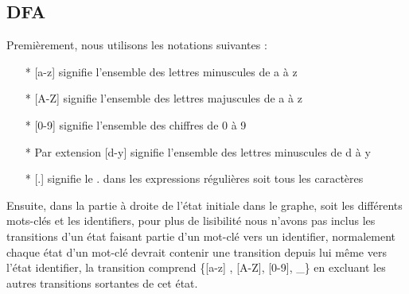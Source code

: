 \documentclass[a4paper,10pt]{article}
\begin{document}
\subsection{DFA}

Premièrement, nous utilisons les notations suivantes :
\begin{itemize}
\item [*][a-z] signifie l'ensemble des lettres minuscules de a à z
\item [*][A-Z] signifie l'ensemble des lettres majuscules de a à z
\item [*][0-9] signifie l'ensemble des chiffres de 0 à 9
\item [*]Par extension [d-y] signifie l'ensemble des lettres minuscules de d à y
\item [*][.] signifie le . dans les expressions régulières soit tous les caractères
\end{itemize}

Ensuite, dans la partie à droite de l'état initiale dans le graphe, soit les différents mots-clés et les identifiers, pour plus de lisibilité nous n'avons pas inclus les transitions d'un état faisant partie d'un mot-clé vers un identifier, normalement chaque état d'un mot-clé devrait contenir une transition depuis lui même vers l'état identifier, la transition comprend \{[a-z] , [A-Z], [0-9], \_\} en excluant les autres transitions sortantes de cet état.
\end{document}
